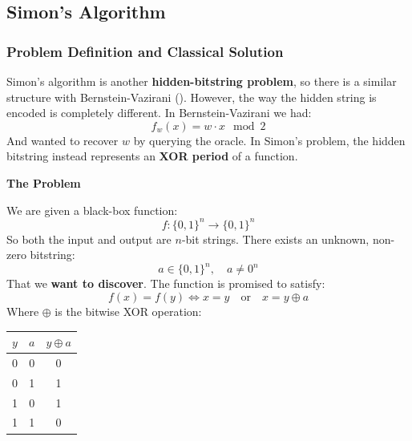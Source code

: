 \subsection{Simon's Algorithm}\label{sec:simons-algorithm}

\subsubsection{Problem Definition and Classical Solution}\label{sec:simons-algorithm-problem-definition-and-classical-solution}

Simon's algorithm is another \textbf{hidden-bitstring problem}, so there is a similar structure with Bernstein-Vazirani (). However, the way the hidden string is encoded is completely different. In Bernstein-Vazirani we had:
\begin{equation*}
    f_w (x) = w \cdot x \mod 2
\end{equation*}
And wanted to recover $w$ by querying the oracle. In Simon's problem, the hidden bitstring instead represents an \textbf{XOR period} of a function.

\highspace
\begin{flushleft}
    \textcolor{Red2}{ \textbf{The Problem}}
\end{flushleft}
We are given a black-box function:
\begin{equation*}
    f: \{0,1\}^{n} \to \{0,1\}^{n}
\end{equation*}
So both the input and output are $n$-bit strings. There exists an unknown, non-zero bitstring:
\begin{equation*}
    a \in \{0,1\}^{n}, \quad a \neq 0^n
\end{equation*}
That we \textbf{want to discover}. The function is promised to satisfy:
\begin{equation}\label{eq:simons-promise}
    f(x) = f(y) \iff x = y \quad \text{or} \quad x = y \oplus a
\end{equation}
Where $\oplus$ is the bitwise XOR operation:
\begin{center}
    \begin{tabular}{@{} c c c @{}}
        \toprule
        $y$ & $a$ & $y \oplus a$ \\
        \midrule
        0 & 0 & 0 \\
        0 & 1 & 1 \\
        1 & 0 & 1 \\
        1 & 1 & 0 \\
        \bottomrule
    \end{tabular}
\end{center}

